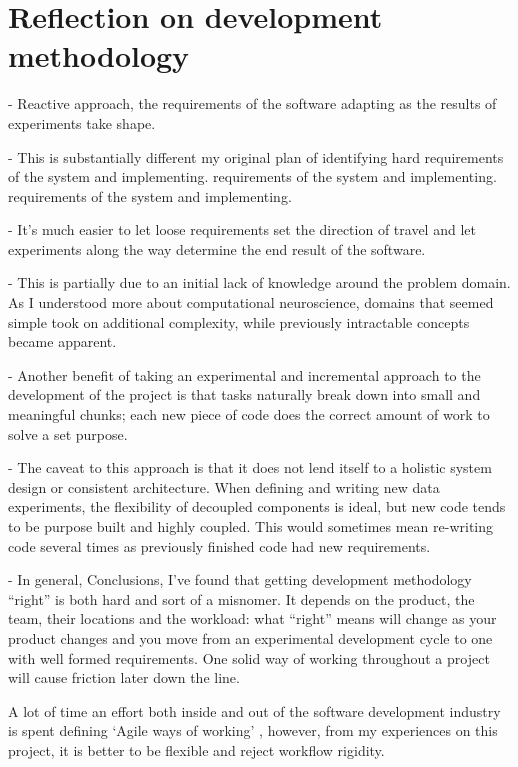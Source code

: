 \section{Reflection on development methodology}

- Reactive approach, the requirements of the software adapting as the results
of experiments take shape.

- This is substantially different my original plan of identifying hard
requirements of the system and implementing.
 requirements of the system and implementing. 
requirements of the system and implementing.

- It's much easier to let loose requirements set the direction of travel and
let experiments along the way determine the end result of the software.

- This is partially due to an initial lack of knowledge around the problem
domain. As I understood more about computational neuroscience, domains that
seemed simple took on additional complexity, while previously intractable
concepts became apparent.

- Another benefit of taking an experimental and incremental approach to the
development of the project is that tasks naturally break down into small and
meaningful chunks; each new piece of code does the correct amount of work to
solve a set purpose.

- The caveat to this approach is that it does not lend itself to a holistic
system design or consistent architecture. When defining and writing new
data experiments, the flexibility of decoupled components is ideal, but new code
tends to be purpose built and highly coupled. This would sometimes mean
re-writing code several times as previously finished code had new requirements.

- In general, Conclusions, I’ve found that getting development methodology
“right” is both hard and sort of a misnomer. It depends on the product, the
team, their locations and the workload: what “right” means will change as your
product changes and you move from an experimental development cycle to one with
well formed requirements. One solid way of working throughout a project will
cause friction later down the line.

A lot of time an effort both inside and out of the software development industry
is spent defining `Agile ways of working' \autocite{spolsky_you_2006}, however, from my experiences on this
project, it is better to be flexible and reject workflow rigidity.

